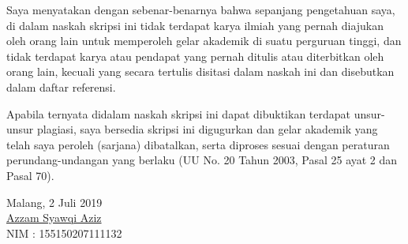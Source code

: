 \documentclass{skripsi}
\begin{document}
\cover

\approvalpage

{\orisinalitas

  Saya menyatakan dengan sebenar-benarnya bahwa sepanjang pengetahuan
  saya, di dalam naskah skripsi ini tidak terdapat karya ilmiah yang
  pernah diajukan oleh orang lain untuk memperoleh gelar akademik di
  suatu perguruan tinggi, dan tidak terdapat karya atau pendapat yang
  pernah ditulis atau diterbitkan oleh orang lain, kecuali yang secara
  tertulis disitasi dalam naskah ini dan disebutkan dalam daftar
  referensi.

  Apabila ternyata didalam naskah skripsi ini dapat dibuktikan
  terdapat unsur-unsur plagiasi, saya bersedia skripsi ini digugurkan
  dan gelar akademik yang telah saya peroleh (sarjana) dibatalkan,
  serta diproses sesuai dengan peraturan perundang-undangan yang
  berlaku (UU No. 20 Tahun 2003, Pasal 25 ayat 2 dan Pasal 70).
  \vspace{1.5cm}

  \noindent
  \hspace*{8cm}Malang, 2 Juli 2019   \vspace{2.5cm}   \\

  \hspace*{7cm}\underline{Azzam Syawqi Aziz} \\
  \hspace*{8cm}NIM : 155150207111132
}
\end{document}
